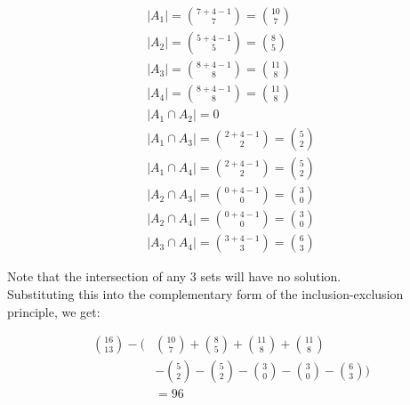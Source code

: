\documentclass{report}
\begin{document}
{{    \begin{align*}
        |A_1| = \binom{7 + 4 - 1}{7} = \binom{10}{7}         \\
        |A_2| = \binom{5 + 4 - 1}{5} = \binom{8}{5}          \\
        |A_3| = \binom{8 + 4 - 1}{8} = \binom{11}{8}         \\
        |A_4| = \binom{8 + 4 - 1}{8} = \binom{11}{8}         \\
        |A_1 \cap A_2| = 0                                   \\
        |A_1 \cap A_3| = \binom{2 + 4 - 1}{2} = \binom{5}{2} \\
        |A_1 \cap A_4| = \binom{2 + 4 - 1}{2} = \binom{5}{2} \\
        |A_2 \cap A_3| = \binom{0 + 4 - 1}{0} = \binom{3}{0} \\
        |A_2 \cap A_4| = \binom{0 + 4 - 1}{0} = \binom{3}{0} \\
        |A_3 \cap A_4| = \binom{3 + 4 - 1}{3} = \binom{6}{3}
    \end{align*}

    Note that the intersection of any 3 sets will have no solution. \\

    Substituting this into the complementary form of the inclusion-exclusion
    principle, we get:

    \begin{align*}
        \binom{16}{13} - \Bigg ( & \binom{10}{7} + \binom{8}{5} + \binom{11}{8} + \binom{11}{8}                       \\
                                 & - \binom{5}{2} - \binom{5}{2} - \binom{3}{0} - \binom{3}{0} - \binom{6}{3} \Bigg ) \\
                                 & = 96
    \end{align*}
}

}
\end{document}
